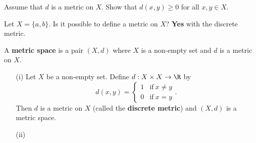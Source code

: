 \begin{eg}
   Assume that \( d  \) is a metric on \( X  \). Show that \( d(x,y) \geq 0  \) for all \( x,y \in X  \). 
\end{eg}

\begin{eg}
   Let \( X  = \{ a,b \}   \). Is it possible to define a metric on \( X  \)? \textbf{Yes} with the discrete metric.
\end{eg}

\begin{definition}
    A \textbf{metric space} is a pair \( (X,d)  \) where \( X  \) is a non-empty set and \( d  \) is a metric on \( X  \).
\end{definition}

\begin{eg}
    \begin{enumerate}
        \item[(i)] Let \( X  \) be a non-empty set. Define \( d: X \times X \to \R  \) by 
            \[  d(x,y) = 
            \begin{cases}
                1 &\text{if} \ x \neq y  \\
                0 &\text{if} \ x = y 
            \end{cases}. \]
            Then \( d  \) is a metric on \( X  \) (called the \textbf{discrete metric}) and \( (X,d) \) is a metric space.
        \item[(ii)] 
    \end{enumerate}
\end{eg}




